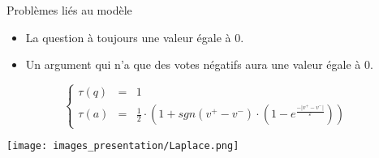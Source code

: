 \documentclass{beamer}
\begin{document}
  \begin{frame}{Problèmes liés au modèle}
    \begin{itemize}
      \item La question à toujours une valeur égale à 0.
      \item Un argument qui n'a que des votes négatifs aura une valeur égale à 0.
    \end{itemize}


    $$
        \left\{\begin{array}{llll}
          \tau(q) & = & 1 & \\
          \tau(a) & = & \frac{1}{2} \cdot \left(1 + sgn(v^+ - v^-) \cdot \left(1 - e^{\frac{-|v^+ - v^-|}{\varepsilon}}\right)\right)
        \end{array}\right.
      $$

      \texttt{[image: images\_presentation/Laplace.png]}
  \end{frame}
\end{document}
